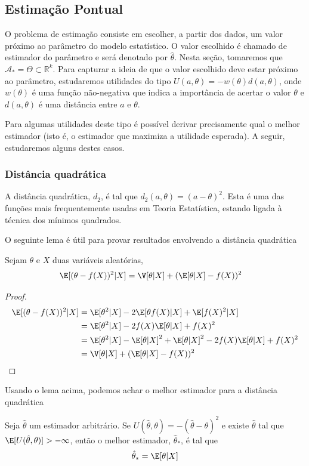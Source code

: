 \subsection{Estimação Pontual}

O problema de estimação consiste em 
escolher, a partir dos dados, 
um valor próximo ao parâmetro do modelo estatístico.
O valor escolhido é chamado de estimador do parâmetro e
será denotado por $\hat{\theta}$.
Nesta seção, tomaremos que 
$\mathcal{A}_{*} = \Theta \subset \mathbb{R}^{k}$.
Para capturar a ideia de que
o valor escolhido deve estar próximo ao parâmetro,
estudaremos utilidades do tipo 
$U(a,\theta) = -w(\theta)d(a,\theta)$,
onde $w(\theta)$ é uma função não-negativa que indica a importância de acertar o valor $\theta$ e
$d(a,\theta)$ é uma distância entre $a$ e $\theta$.

Para algumas utilidades deste tipo é possível derivar
precisamente qual o melhor estimador (isto é, o estimador que maximiza a utilidade esperada).
A seguir, estudaremos alguns destes casos.

\subsubsection{Distância quadrática}

A distância quadrática, $d_{2}$, 
é tal que $d_{2}(a,\theta) = (a-\theta)^{2}$.
Esta é uma das funções mais frequentemente usadas 
em Teoria Estatística,
estando ligada à técnica dos mínimos quadrados.

O seguinte lema é útil para 
provar resultados envolvendo 
a distância quadrática
\begin{lemma}
 \label{lemma:conditional_l2}
 Sejam $\theta$ e $X$ 
 duas variáveis aleatórias,
 \begin{align*}
  \E[(\theta-f(X))^{2}|X]
  &= \V[\theta|X] + (\E[\theta|X]-f(X))^{2}
 \end{align*}
\end{lemma}
\begin{proof}
 \begin{align*}
  \E[(\theta-f(X))^{2}|X]
  &= \E[\theta^{2}|X] 
  -2\E[\theta f(X)|X] + \E[f(X)^{2}|X] \\
  &= \E[\theta^{2}|X] -2f(X)\E[\theta|X] + f(X)^{2} \\
  &= \E[\theta^{2}|X] -\E[\theta|X]^{2} +\E[\theta|X]^{2} 
  -2f(X)\E[\theta|X] + f(X)^{2}	\\
  &= \V[\theta|X] + (\E[\theta|X]-f(X))^{2}
 \end{align*}
\end{proof}
Usando o lema acima, podemos 
achar o melhor estimador para
a distância quadrática
\begin{theorem}
 \label{thm:estimation_l2}
 Seja $\hat{\theta}$ um estimador arbitrário.
 Se $U(\hat{\theta},\theta) = -(\hat{\theta}-\theta)^{2}$
 e existe $\hat{\theta}$ tal que 
 $\E[U(\hat{\theta},\theta)] > -\infty$,
 então o melhor estimador, $\hat{\theta}_{*}$, 
 é tal que
 \begin{align*}
  \hat{\theta}_{*} = \E[\theta|X]
 \end{align*}
\end{theorem}

